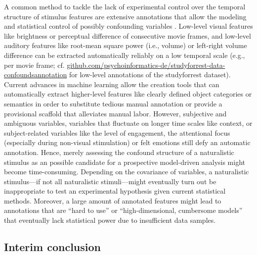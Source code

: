 %
A common method to tackle the lack of experimental control over the temporal
structure of stimulus features are extensive annotations that allow the modeling
and statistical control of possibly confounding variables
\citep[e.g.,][]{deniz2019representation}.
%
Low-level visual features like brightness or
perceptual difference of consecutive movie frames, and low-level auditory
features like root-mean square power (i.e., volume) or left-right volume
difference can be extracted automatically reliably on a low temporal scale
(e.g., per movie frame; cf.
\href{https://github.com/psychoinformatics-de/studyforrest-data-confoundsannotation
}{\url{github.com/psychoinformatics-de/studyforrest-data-confoundsannotation}}
for low-level annotations of the studyforrest dataset).
%
Current advances in machine learning allow the creation tools \citep[e.g., the
toolbox ``pliers'' that is implemented in the
\href{https://neuroscout.org/}{\url{neuroscout.org}}
platform;][]{mcnamara2017developing, delavega2022neuroscout} that can
automatically extract higher-level features like clearly defined object
categories or semantics in order to substitute tedious manual annotation or
provide a provisional scaffold that alleviates manual labor.
%
However, subjective and ambiguous variables, variables that fluctuate on longer
time scales like context, or subject-related variables like the level of
engagement, the attentional focus (especially during non-visual stimulation) or
felt emotions \citep[cf., e.g.,][]{lettieri2019emotionotopy,
saarimaki2021naturalistic} still defy an automatic annotation.
%
Hence, merely assessing the confound structure of a naturalistic stimulus as an
possible candidate for a prospective model-driven analysis might become
time-consuming.
%
Depending on the covariance of variables, a naturalistic stimulus---if not all
naturalistic stimuli---might eventually turn out be inappropriate to test an
experimental hypothesis given current statistical methods.
%
Moreover, a large amount of annotated features might lead to annotations that
are ``hard to use'' \citep[][p. 2]{richard2019fast} or ``high-dimensional,
cumbersome models'' \citep[][p. 2]{richard2019fast} that eventually lack
statistical power due to insufficient data samples.



\subsection{Interim conclusion}

